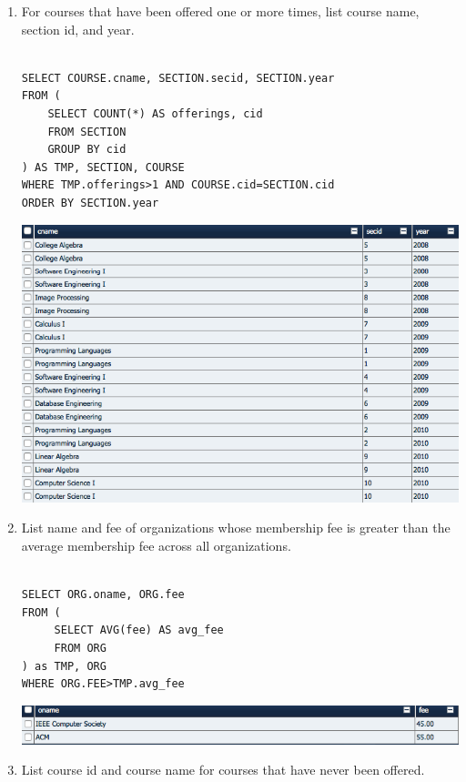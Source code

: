 \documentclass[11pt]{article}
\begin{document}
\begin{enumerate}
\item For courses that have been offered one or more times, list course name, section id, and year.

\begin{verbatim}

SELECT COURSE.cname, SECTION.secid, SECTION.year
FROM (
    SELECT COUNT(*) AS offerings, cid
    FROM SECTION
    GROUP BY cid
) AS TMP, SECTION, COURSE
WHERE TMP.offerings>1 AND COURSE.cid=SECTION.cid
ORDER BY SECTION.year

\end{verbatim}

\includegraphics[scale=0.5]{45.png}

\item List name and fee of organizations whose membership fee is greater than the average membership fee across all organizations.

\begin{verbatim}

SELECT ORG.oname, ORG.fee
FROM (
     SELECT AVG(fee) AS avg_fee
     FROM ORG
) as TMP, ORG
WHERE ORG.FEE>TMP.avg_fee

\end{verbatim}

\includegraphics[scale=0.5]{46.png}

\item List course id and course name for courses that have never been offered.

\begin{verbatim}


\end{verbatim}
\end{enumerate}
\end{document}
